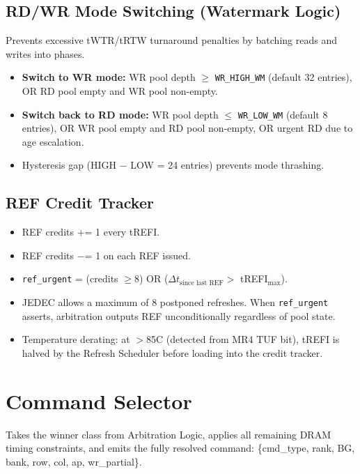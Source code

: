 \documentclass[11pt,a4paper]{article}
\newcommand{\reg}[1]{\textcolor{ddrpurple}{\texttt{#1}}}
\newcommand{\sig}[1]{\textcolor{ddrteal}{\texttt{#1}}}
\begin{document}
\subsection{RD/WR Mode Switching (Watermark Logic)}

Prevents excessive tWTR/tRTW turnaround penalties by batching reads and
writes into phases.

\begin{itemize}[leftmargin=1.5em,itemsep=2pt]
  \item \textbf{Switch to WR mode:} WR pool depth $\geq$ \reg{WR\_HIGH\_WM}
        (default 32 entries), OR RD pool empty and WR pool non-empty.
  \item \textbf{Switch back to RD mode:} WR pool depth $\leq$ \reg{WR\_LOW\_WM}
        (default 8 entries), OR WR pool empty and RD pool non-empty, OR
        urgent RD due to age escalation.
  \item Hysteresis gap (HIGH $-$ LOW = 24 entries) prevents mode thrashing.
\end{itemize}

\subsection{REF Credit Tracker}

\begin{itemize}[leftmargin=1.5em,itemsep=2pt]
  \item REF credits += 1 every tREFI.
  \item REF credits $-$= 1 on each REF issued.
  \item \sig{ref\_urgent} = (credits $\geq 8$) OR ($\Delta t_{\text{since last REF}} >$
        tREFI$_{\max}$).
  \item JEDEC allows a maximum of 8 postponed refreshes. When \sig{ref\_urgent}
        asserts, arbitration outputs REF unconditionally regardless of pool state.
  \item Temperature derating: at $>$85\textdegree C (detected from MR4 TUF bit),
        tREFI is halved by the Refresh Scheduler before loading into the credit tracker.
\end{itemize}

\section{Command Selector}

Takes the winner class from Arbitration Logic, applies all remaining DRAM
timing constraints, and emits the fully resolved command:
\{cmd\_type, rank, BG, bank, row, col, ap, wr\_partial\}.
\end{document}
